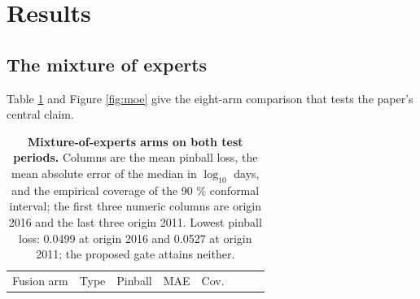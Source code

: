 \documentclass[3p,times]{elsarticle}
\begin{document}
\section{Results}\label{sec:results}

\subsection{The mixture of experts}\label{the-mixture-of-experts}

Table \ref{tbl:moe} and Figure \ref{fig:moe} give the eight-arm
comparison that tests the paper's central claim.

\begin{longtable}[]{@{}
  >{\raggedright\arraybackslash}p{}
  >{\raggedright\arraybackslash}p{}
  >{\raggedleft\arraybackslash}p{}
  >{\raggedleft\arraybackslash}p{}
  >{\raggedleft\arraybackslash}p{}
  >{\raggedleft\arraybackslash}p{}
  >{\raggedleft\arraybackslash}p{}
  >{\raggedleft\arraybackslash}p{}@{}}
\caption{\textbf{Mixture-of-experts arms on both test periods.} Columns
are the mean pinball loss, the mean absolute error of the median in
\(\log_{10}\) days, and the empirical coverage of the 90 \% conformal
interval; the first three numeric columns are origin 2016 and the last
three origin 2011. Lowest pinball loss: 0.0499 at origin 2016 and 0.0527
at origin 2011; the proposed gate attains
neither.}\label{tbl:moe}\tabularnewline
\toprule\noalign{}
\begin{minipage}[b]{\linewidth}\raggedright
Fusion arm
\end{minipage} & \begin{minipage}[b]{\linewidth}\raggedright
Type
\end{minipage} & \begin{minipage}[b]{\linewidth}\raggedleft
Pinball
\end{minipage} & \begin{minipage}[b]{\linewidth}\raggedleft
MAE
\end{minipage} & \begin{minipage}[b]{\linewidth}\raggedleft
Cov.
\end{minipage} & \begin{minipage}[b]{\linewidth}\raggedleft

\end{minipage}
\end{longtable}
\end{document}
